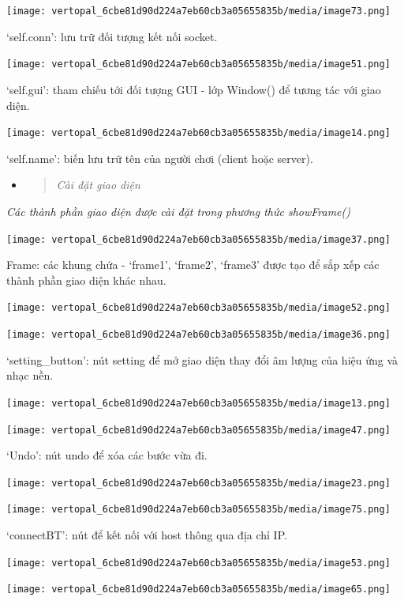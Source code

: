 \documentclass[a4paper]{article}
\begin{document}
\texttt{[image: vertopal\_6cbe81d90d224a7eb60cb3a05655835b/media/image73.png]}

`self.conn': lưu trữ đối tượng kết nối socket.

\texttt{[image: vertopal\_6cbe81d90d224a7eb60cb3a05655835b/media/image51.png]}

`self.gui': tham chiếu tới đối tượng GUI - lớp Window() để tương tác với
giao diện.

\texttt{[image: vertopal\_6cbe81d90d224a7eb60cb3a05655835b/media/image14.png]}

`self.name': biến lưu trữ tên của người chơi (client hoặc server).

\begin{itemize}
\item
  \begin{quote}
  \emph{Cài đặt giao diện}
  \end{quote}
\end{itemize}

\emph{Các thành phần giao diện được cài đặt trong phương thức
showFrame()}

\texttt{[image: vertopal\_6cbe81d90d224a7eb60cb3a05655835b/media/image37.png]}

Frame: các khung chứa - `frame1', `frame2', `frame3' được tạo để sắp xếp
các thành phần giao diện khác nhau.

\texttt{[image: vertopal\_6cbe81d90d224a7eb60cb3a05655835b/media/image52.png]}

\texttt{[image: vertopal\_6cbe81d90d224a7eb60cb3a05655835b/media/image36.png]}

`setting\_button': nút setting để mở giao diện thay đổi âm lượng của
hiệu ứng và nhạc nền.

\texttt{[image: vertopal\_6cbe81d90d224a7eb60cb3a05655835b/media/image13.png]}

\texttt{[image: vertopal\_6cbe81d90d224a7eb60cb3a05655835b/media/image47.png]}

`Undo': nút undo để xóa các bước vừa đi.

\texttt{[image: vertopal\_6cbe81d90d224a7eb60cb3a05655835b/media/image23.png]}

\texttt{[image: vertopal\_6cbe81d90d224a7eb60cb3a05655835b/media/image75.png]}

`connectBT': nút để kết nối với host thông qua địa chỉ IP.

\texttt{[image: vertopal\_6cbe81d90d224a7eb60cb3a05655835b/media/image53.png]}

\texttt{[image: vertopal\_6cbe81d90d224a7eb60cb3a05655835b/media/image65.png]}
\end{document}
